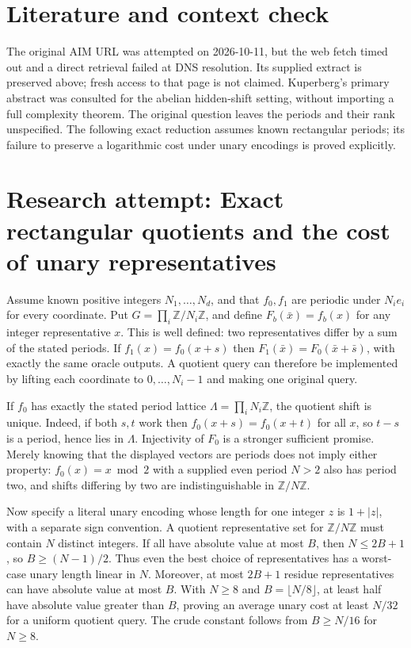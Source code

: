 \documentclass[11pt]{article}
\begin{document}
\section{Literature and context check}
The original AIM URL was attempted on 2026-10-11, but the web fetch timed out and a direct retrieval failed at DNS resolution. Its supplied extract is preserved above; fresh access to that page is not claimed. Kuperberg's primary abstract was consulted for the abelian hidden-shift setting, without importing a full complexity theorem. The original question leaves the periods and their rank unspecified. The following exact reduction assumes known rectangular periods; its failure to preserve a logarithmic cost under unary encodings is proved explicitly.
\section{Research attempt: Exact rectangular quotients and the cost of unary representatives}
Assume known positive integers $N_1,\ldots,N_d$, and that $f_0,f_1$ are periodic under $N_i e_i$ for every coordinate. Put $G=\prod_i\mathbb Z/N_i\mathbb Z$, and define $F_b(\bar x)=f_b(x)$ for any integer representative $x$. This is well defined: two representatives differ by a sum of the stated periods. If $f_1(x)=f_0(x+s)$ then $F_1(\bar x)=F_0(\bar x+\bar s)$, with exactly the same oracle outputs. A quotient query can therefore be implemented by lifting each coordinate to $0,\ldots,N_i-1$ and making one original query.

If $f_0$ has exactly the stated period lattice $\Lambda=\prod_iN_i\mathbb Z$, the quotient shift is unique. Indeed, if both $s,t$ work then $f_0(x+s)=f_0(x+t)$ for all $x$, so $t-s$ is a period, hence lies in $\Lambda$. Injectivity of $F_0$ is a stronger sufficient promise. Merely knowing that the displayed vectors are periods does not imply either property: $f_0(x)=x\bmod2$ with a supplied even period $N>2$ also has period two, and shifts differing by two are indistinguishable in $\mathbb Z/N\mathbb Z$.

Now specify a literal unary encoding whose length for one integer $z$ is $1+|z|$, with a separate sign convention. A quotient representative set for $\mathbb Z/N\mathbb Z$ must contain $N$ distinct integers. If all have absolute value at most $B$, then $N\leq2B+1$, so $B\geq(N-1)/2$. Thus even the best choice of representatives has a worst-case unary length linear in $N$. Moreover, at most $2B+1$ residue representatives can have absolute value at most $B$. With $N\geq8$ and $B=\lfloor N/8\rfloor$, at least half have absolute value greater than $B$, proving an average unary cost at least $N/32$ for a uniform quotient query. The crude constant follows from $B\geq N/16$ for $N\geq8$.
\end{document}
